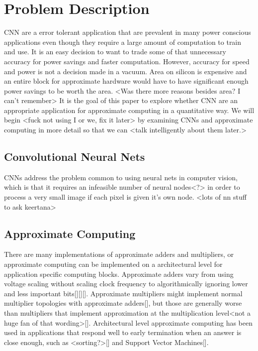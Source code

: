 \documentclass[conference]{IEEEtran}
\begin{document}
\section{Problem Description}
CNN are a error tolerant application that are prevalent in many power conscious applications even though they require a large amount of computation to train and use. It is an easy decision to want to trade some of that unnecessary accuracy for power savings and faster computation. However, accuracy for speed and power is not a decision made in a vacuum. Area on silicon is expensive and an entire block for approximate hardware would have to have significant enough power savings to be worth the area. <Was there more reasons besides area? I can't remember> It is the goal of this paper to explore whether CNN are an appropriate application for approximate computing in a quantitative way. We will begin <fuck not using I or we, fix it later> by examining CNNs and approximate computing in more detail so that we can <talk intelligently about them later.>
\subsection{Convolutional Neural Nets}
CNNs address the problem common to using neural nets in computer vision, which is that it requires an infeasible number of neural nodes<?> in order to process a very small image if each pixel is given it's own node. <lots of nn stuff to ask keertana>
\subsection{Approximate Computing}
There are many implementations of approximate adders and multipliers, or approximate computing can be implemented on a architectural level for application specific computing blocks. Approximate adders vary from using voltage scaling without scaling clock frequency to algorithmically ignoring lower and less important bits[][][]. Approximate multipliers might implement normal multiplier topologies with approximate adders[], but those are generally worse than multipliers that implement approximation at the multiplication level<not a huge fan of that wording>[]. Architectural level approximate computing has been used in applications that respond well to early termination when an answer is close enough, such as <sorting?>[] and Support Vector Machines[].
\end{document}
